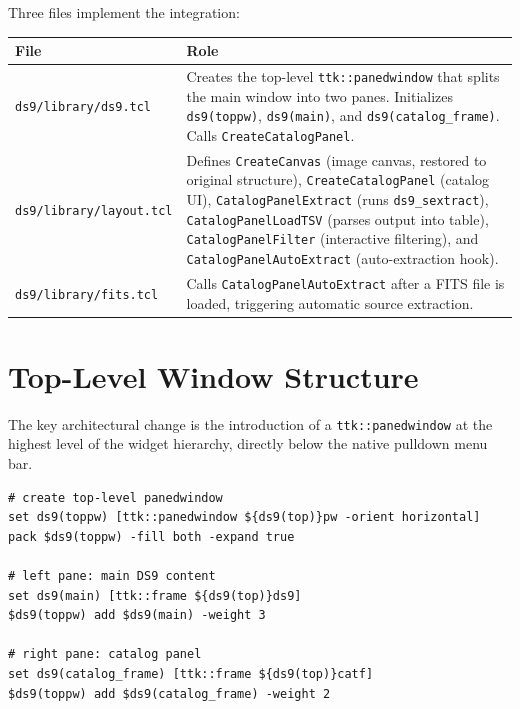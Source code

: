 \documentclass[11pt,fleqn]{book}
\newcommand{\sextract}{\texttt{ds9\_sextract}}
\begin{document}
Three files implement the integration:

\begin{center}
\begin{longtable}{L{4.2cm} L{8.8cm}}
\toprule
\textbf{File} & \textbf{Role} \\
\midrule
\endhead
\texttt{ds9/library/ds9.tcl} & Creates the top-level \texttt{ttk::panedwindow} that splits the main window into two panes. Initializes \texttt{ds9(toppw)}, \texttt{ds9(main)}, and \texttt{ds9(catalog\_frame)}. Calls \texttt{CreateCatalogPanel}. \\
\midrule
\texttt{ds9/library/layout.tcl} & Defines \texttt{CreateCanvas} (image canvas, restored to original structure), \texttt{CreateCatalogPanel} (catalog UI), \texttt{CatalogPanelExtract} (runs \sextract{}), \texttt{CatalogPanelLoadTSV} (parses output into table), \texttt{CatalogPanelFilter} (interactive filtering), and \texttt{CatalogPanelAutoExtract} (auto-extraction hook). \\
\midrule
\texttt{ds9/library/fits.tcl} & Calls \texttt{CatalogPanelAutoExtract} after a FITS file is loaded, triggering automatic source extraction. \\
\bottomrule
\end{longtable}
\end{center}

\section{Top-Level Window Structure}

The key architectural change is the introduction of a \texttt{ttk::panedwindow} at the highest level of the widget hierarchy, directly below the native pulldown menu bar.

\begin{codebox}
\begin{lstlisting}[style=tcl,numbers=none]
# create top-level panedwindow
set ds9(toppw) [ttk::panedwindow ${ds9(top)}pw -orient horizontal]
pack $ds9(toppw) -fill both -expand true

# left pane: main DS9 content
set ds9(main) [ttk::frame ${ds9(top)}ds9]
$ds9(toppw) add $ds9(main) -weight 3

# right pane: catalog panel
set ds9(catalog_frame) [ttk::frame ${ds9(top)}catf]
$ds9(toppw) add $ds9(catalog_frame) -weight 2
\end{lstlisting}
\end{codebox}
\end{document}
